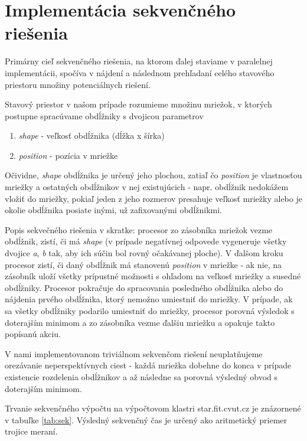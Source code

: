 \documentclass[slovak]{article}
\begin{document}
\section{Implementácia sekvenčného riešenia}

Primárny cieľ sekvenčného riešenia, na ktorom ďalej staviame v paralelnej implementácii, spočíva v nájdení a následnom prehľadaní celého stavového priestoru množiny potenciálnych riešení. 

Stavový priestor v našom prípade rozumieme množinu mriežok, v ktorých postupne spracúvame obdĺžniky s dvojicou parametrov

\begin{enumerate}

\item \emph{shape} - veľkosť obdĺžnika (dĺžka x šírka)

\item \emph{position} - pozícia v mriežke

\end{enumerate}

Očividne, \emph{shape} obdĺžnika je určený jeho plochou, zatiaľ čo \emph{position} je vlastnosťou mriežky a ostatných obdĺžnikov v nej existujúcich - napr. obdĺžnik nedokážem vložiť do mriežky, pokiaľ jeden z jeho rozmerov presahuje veľkosť mriežky alebo je okolie obdĺžnika posiate inými, už zafixovanými obdĺžnikmi.

Popis sekvečného riešenia v skratke: procesor zo zásobníka mriežok vezme obdĺžnik, zistí, či má \emph{shape} (v prípade negatívnej odpovede vygeneruje všetky dvojice \emph{a}, \emph{b} tak, aby ich súčin bol rovný očakávanej ploche). V ďalšom kroku procesor zistí, či daný obdĺžnik má stanovenú \emph{position} v mriežke - ak nie, na zásobník uloží všetky prípustné možnosti s ohľadom na veľkosť mriežky a susedné obdĺžniky. Procesor pokračuje do spracovania posledného obdĺžnika alebo do nájdenia prvého obdĺžnika, ktorý nemožno umiestniť do mriežky. V prípade, ak sa všetky obdĺžniky podarilo umiestniť do mriežky, procesor porovná výsledok s doterajším minimom a zo zásobníka vezme ďalšiu mriežku a opakuje takto popísanú akciu.

V nami implementovanom triviálnom sekvenčom riešení neuplatňujeme orezávanie neperspektívnych ciest - každá mriežka dobehne do konca v prípade existencie rozdelenia obdĺžnikov a až následne sa porovná výsledný obvod s doterajším minimom.

Trvanie sekvenčného výpočtu na výpočtovom klastri star.fit.cvut.cz je znázornené v tabuľke \ref{tab:sek}. Výsledný sekvenčný čas je určený ako aritmetický priemer trojice meraní.
\end{document}
